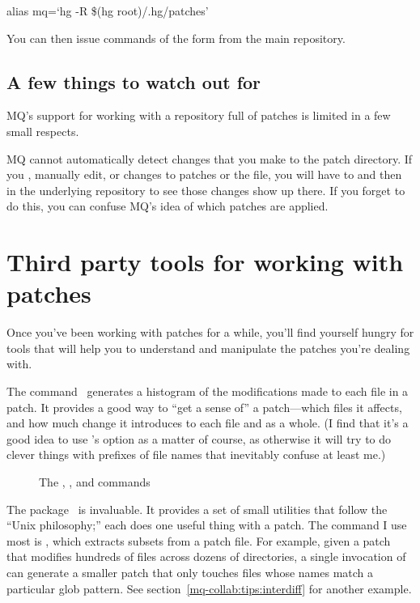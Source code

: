 \begin{codesample2}
  alias mq=`hg -R \$(hg root)/.hg/patches'
\end{codesample2}

You can then issue commands of the form  from
the main repository.

\subsection{A few things to watch out for}

MQ's support for working with a repository full of patches is limited
in a few small respects.

MQ cannot automatically detect changes that you make to the patch
directory.  If you , manually edit, or 
changes to patches or the  file, you will have to
 and then
 in the underlying repository to
see those changes show up there.  If you forget to do this, you can
confuse MQ's idea of which patches are applied.

\section{Third party tools for working with patches}
\label{sec:mq:tools}

Once you've been working with patches for a while, you'll find
yourself hungry for tools that will help you to understand and
manipulate the patches you're dealing with.

The  command~\cite{web:diffstat} generates a
histogram of the modifications made to each file in a patch.  It
provides a good way to ``get a sense of'' a patch---which files it
affects, and how much change it introduces to each file and as a
whole.  (I find that it's a good idea to use 's
 option as a matter of course, as otherwise it
will try to do clever things with prefixes of file names that
inevitably confuse at least me.)

\begin{figure}[ht]
  \caption{The , , and  commands}
  \label{ex:mq:tools}
\end{figure}

The  package~\cite{web:patchutils} is invaluable.
It provides a set of small utilities that follow the ``Unix
philosophy;'' each does one useful thing with a patch.  The
 command I use most is , which
extracts subsets from a patch file.  For example, given a patch that
modifies hundreds of files across dozens of directories, a single
invocation of  can generate a smaller patch that
only touches files whose names match a particular glob pattern.  See
section~\ref{mq-collab:tips:interdiff} for another example.

